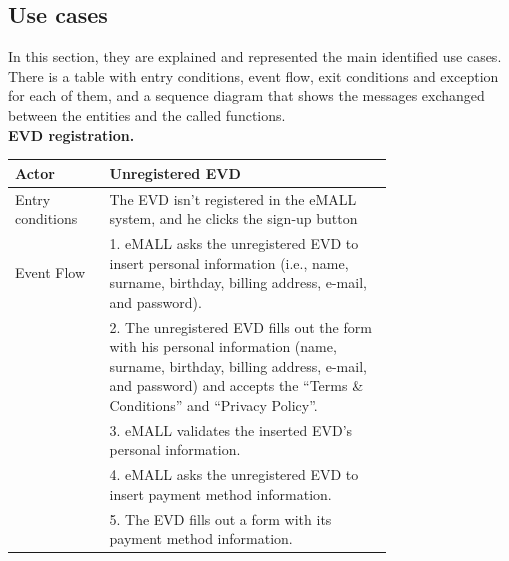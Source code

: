 \subsection{Use cases}
\label{subsec: use_cases}%
In this section, they are explained and represented the main identified use cases.
There is a table with entry conditions, event flow, exit conditions and exception for each of them, and a sequence diagram
that shows the messages exchanged between the entities and the called functions. \\
\textbf{EVD registration.}
\begin{center}
    \begin{longtable}{lp{0.75\linewidth}}
        \hline
        Actor            & Unregistered EVD                                                                                                                                                                                      \\
        \hline
        Entry conditions & The EVD isn’t registered in the eMALL system, and he clicks the sign-up button                                                                                                                        \\
        \hline
        Event Flow       & 1. eMALL asks the unregistered EVD to insert personal information (i.e., name, surname, birthday, billing address, e-mail, and password).                                                             \\
        & 2. The unregistered EVD fills out the form with his personal information (name, surname, birthday, billing address, e-mail, and password) and accepts the “Terms \& Conditions” and “Privacy Policy”. \\
        & 3. eMALL validates the inserted EVD’s personal information.                                                                                                                                           \\
        & 4. eMALL asks the unregistered EVD to insert payment method information.                                                                                                                              \\
        & 5. The EVD fills out a form with its payment method information.                                                                                                                                      \\

\end{longtable}
\end{center}
